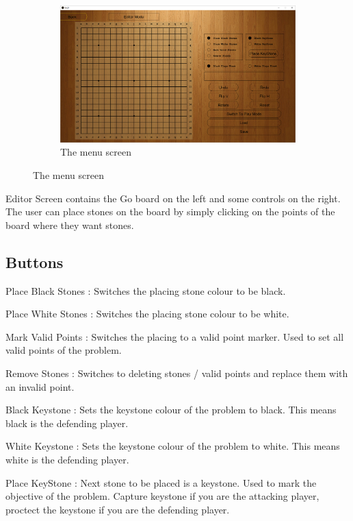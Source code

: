 \documentclass{l4proj}
\begin{document}
\begin{appendices}
\begin{figure}[H]
\centering
\begin{subfigure}[b]{\textwidth}
\centering
\includegraphics[width=\textwidth]{A3/3.png}
\caption{The menu screen}
\end{subfigure}
\end{figure}

Editor Screen contains the Go board on the left and some controls on the right. The user can place stones on the board by simply clicking on the points of the board where they want stones.

\subsection{Buttons}

Place Black Stones : Switches the placing stone colour to be black.

Place White Stones : Switches the placing stone colour to be white.

Mark Valid Points : Switches the placing to a valid point marker. Used to set all valid points of the problem.

Remove Stones : Switches to deleting stones / valid points and replace them with an invalid point.


Black Keystone : Sets the keystone colour of the problem to black. This means black is the defending player.

White Keystone : Sets the keystone colour of the problem to white. This means white is the defending player.

Place KeyStone : Next stone to be placed is a keystone. Used to mark the objective of the problem. Capture keystone if you are the attacking player, proctect the keystone if you are the defending player.


\end{appendices}
\end{document}
